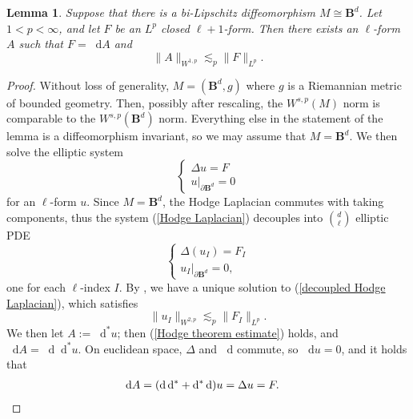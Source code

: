 \documentclass[reqno,11pt]{amsart}
\newcommand{\Ball}{\mathbf{B}}
\newcommand*\dif{\mathop{}\!\mathrm{d}}
\newtheorem{lemma}[theorem]{Lemma}
\theoremstyle{definition}
\numberwithin{equation}{section}
\begin{document}
\begin{lemma}\label{Hodge theorem}
Suppose that there is a bi-Lipschitz diffeomorphism $M \cong \Ball^d$.
Let $1 < p < \infty$, and let $F$ be an $L^p$ closed $\ell + 1$-form.
Then there exists an $\ell$-form $A$ such that $F = \dif A$ and
\begin{equation}\label{Hodge theorem estimate}
\|A\|_{W^{1, p}} \lesssim_p \|F\|_{L^p}.
\end{equation}
\end{lemma}
\begin{proof}
Without loss of generality, $M = (\Ball^d, g)$ where $g$ is a Riemannian metric of bounded geometry.
Then, possibly after rescaling, the $W^{s, p}(M)$ norm is comparable to the $W^{s, p}(\Ball^d)$ norm.
Everything else in the statement of the lemma is a diffeomorphism invariant, so we may assume that $M = \Ball^d$.
We then solve the elliptic system 
\begin{equation}\label{Hodge Laplacian}
\begin{cases}
	\Delta u = F \\
	u|_{\partial \Ball^d} = 0
\end{cases}
\end{equation}
for an $\ell$-form $u$.
Since $M = \Ball^d$, the Hodge Laplacian commutes with taking components, thus the system (\ref{Hodge Laplacian}) decouples into $\binom d\ell$ elliptic PDE
\begin{equation}\label{decoupled Hodge Laplacian}
\begin{cases}
\Delta(u_I) = F_I \\
u_I|_{\partial \Ball^d} = 0,
\end{cases}
\end{equation}
one for each $\ell$-index $I$.
By \cite[Chapter 3, Theorem 6.3]{chen1998second}, we have a unique solution to (\ref{decoupled Hodge Laplacian}), which satisfies
$$\|u_I\|_{W^{2, p}} \lesssim_p \|F_I\|_{L^p}.$$
We then let $A := \dif^* u$; then (\ref{Hodge theorem estimate}) holds, and $\dif A = \dif \dif^* u$.
On euclidean space, $\Delta$ and $\dif$ commute, so $\dif u = 0$, and it holds that 
\begin{align*}
\dif A &= (\dif \dif^* + \dif^* \dif) u = \Delta u = F. \qedhere 
\end{align*}
\end{proof}
\end{document}
